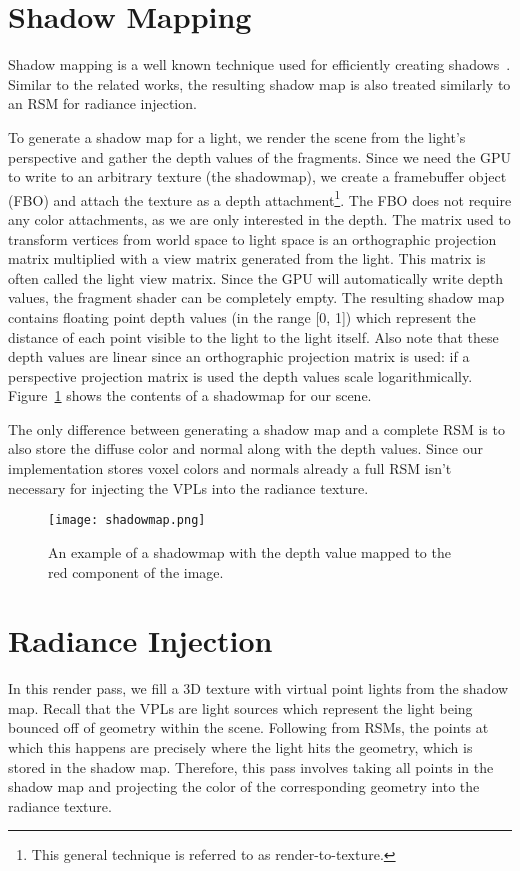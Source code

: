 \section{Shadow Mapping}
Shadow mapping is a well known technique used for efficiently creating shadows~\cite{Williams:1978:CCS:965139.807402}. Similar to the related works, the resulting shadow map is also treated similarly to an RSM for radiance injection.

To generate a shadow map for a light, we render the scene from the light's perspective and gather the depth values of the fragments. Since we need the GPU to write to an arbitrary texture (the shadowmap), we create a framebuffer object (FBO) and attach the texture as a depth attachment\footnote{This general technique is referred to as render-to-texture.}. The FBO does not require any color attachments, as we are only interested in the depth. The matrix used to transform vertices from world space to light space is an orthographic projection matrix multiplied with a view matrix generated from the light. This matrix is often called the light view matrix. Since the GPU will automatically write depth values, the fragment shader can be completely empty. The resulting shadow map contains floating point depth values (in the range [0, 1]) which represent the distance of each point visible to the light to the light itself. Also note that these depth values are linear since an orthographic projection matrix is used: if a perspective projection matrix is used the depth values scale logarithmically. Figure~\ref{fig:shadowmap} shows the contents of a shadowmap for our scene.

The only difference between generating a shadow map and a complete RSM is to also store the diffuse color and normal along with the depth values. Since our implementation stores voxel colors and normals already a full RSM isn't necessary for injecting the VPLs into the radiance texture.

\begin{figure}[h!]
\centering
    \texttt{[image: shadowmap.png]}
    \caption{An example of a shadowmap with the depth value mapped to the red component of the image.}
    \label{fig:shadowmap}
\end{figure}

\section{Radiance Injection}
In this render pass, we fill a 3D texture with virtual point lights from the shadow map. Recall that the VPLs are light sources which represent the light being bounced off of geometry within the scene. Following from RSMs, the points at which this happens are precisely where the light hits the geometry, which is stored in the shadow map. Therefore, this pass involves taking all points in the shadow map and projecting the color of the corresponding geometry into the radiance texture.

